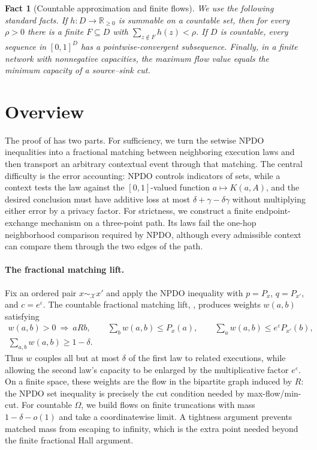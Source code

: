 \documentclass[11pt]{article}
\newtheorem{fact}[lemma]{Fact}
\begin{document}
\begin{fact}[Countable approximation and finite flows]
\label{fact:basic-tools}
We use the following standard facts.  If $h:D\to\mathbb R_{\geq0}$ is
summable on a countable set, then for every $\rho>0$ there is a finite
$F\subseteq D$ with $\sum_{z\notin F}h(z)<\rho$.  If $D$ is countable, every
sequence in $[0,1]^D$ has a pointwise-convergent subsequence.  Finally, in a
finite network with nonnegative capacities, the maximum flow value equals the
minimum capacity of a source--sink cut.
\end{fact}

\section{Overview}
\label{sec:overview}

The proof of  has two parts.  For sufficiency, we turn the
setwise NPDO inequalities into a fractional matching between neighboring
execution laws and then transport an arbitrary contextual event through that
matching.  The central difficulty is the error accounting: NPDO controls
indicators of sets, while a context tests the law against the $[0,1]$-valued
function $a\mapsto K(a,A)$, and the desired conclusion must have additive
loss at most $\delta+\gamma-\delta\gamma$ without multiplying either error by
a privacy factor.  For strictness, we construct a finite endpoint-exchange mechanism on
a three-point path.  Its laws fail the one-hop neighborhood comparison
required by NPDO, although every admissible context can compare them through
the two edges of the path.

\paragraph{The fractional matching lift.}
Fix an ordered pair $x\sim_{\mathcal X}x'$ and apply the NPDO inequality with
$p=P_x$, $q=P_{x'}$, and $c=e^\varepsilon$.  The countable fractional
matching lift, , produces weights $w(a,b)$ satisfying
\[
 \begin{gathered}
 w(a,b)>0\ \Longrightarrow\ aRb,
 \qquad \sum_b w(a,b)\leq P_x(a),
 \qquad \sum_a w(a,b)\leq e^\varepsilon P_{x'}(b),\\
 \sum_{a,b}w(a,b)\geq1-\delta.
 \end{gathered}
\]
Thus $w$ couples all but at most $\delta$ of the first law to related
executions, while allowing the second law's capacity to be enlarged by the
multiplicative factor $e^\varepsilon$.  On a finite space, these weights are
the flow in the bipartite graph induced by $R$: the NPDO set inequality is
precisely the cut condition needed by max-flow/min-cut.  For countable
$\Omega$, we build flows on finite truncations with mass $1-\delta-o(1)$ and
take a coordinatewise limit.  A tightness argument prevents matched mass from
escaping to infinity, which is the extra point needed beyond the finite
fractional Hall argument.
\end{document}
